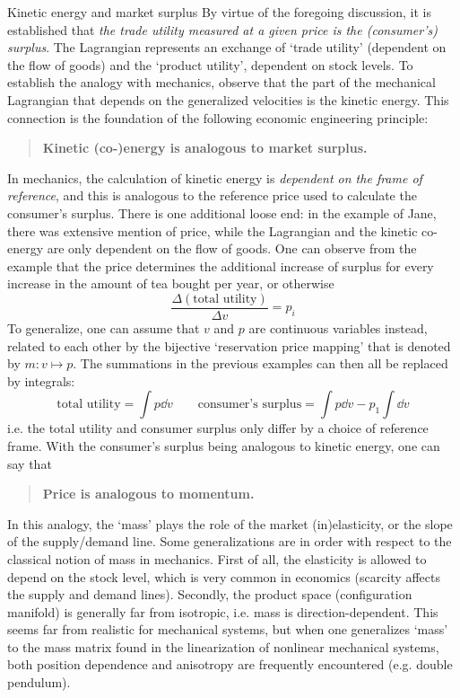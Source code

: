 \begin{econ}{Kinetic energy and market surplus}
   By virtue of the foregoing discussion, it is established that \emph{the trade utility measured at a given price is the (consumer's) surplus}. The Lagrangian represents an exchange of `trade utility' (dependent on the flow of goods) and the `product utility', dependent on stock levels. To establish the analogy with mechanics, observe that the part of the mechanical Lagrangian that depends on the generalized velocities is the kinetic energy. This connection is the foundation of the following economic engineering principle:
    \begin{quote}
        \textbf{Kinetic (co-)energy is analogous to market surplus.}
    \end{quote}
    In mechanics, the calculation of kinetic energy is \emph{dependent on the frame of reference}, and this is analogous to the reference price used to calculate the consumer's surplus. There is one additional loose end: in the example of Jane, there was extensive mention of price, while the Lagrangian and the kinetic co-energy are only dependent on the flow of goods. One can observe from the example that the price determines the additional increase of surplus for every increase in the amount of tea bought per year, or otherwise
    $$
        \frac{\Delta (\text{total utility})}{\Delta v} = p_i
    $$
    To generalize, one can assume that $v$ and $p$ are continuous variables instead, related to each other by the bijective `reservation price mapping' that is denoted by $m: v \mapsto p$. The summations in the previous examples can then all be replaced by integrals:
    $$ 
        \text{total utility} = \int p\dd{v} \qquad 
        \text{consumer's surplus} = \int p\dd{v} - p_1\int \dd{v}
    $$ 
    i.e. the total utility and consumer surplus only differ by a choice of reference frame. With the consumer's surplus being analogous to kinetic energy, one can say that
    \begin{quote}
        \textbf{Price is analogous to momentum.}
    \end{quote}
    In this analogy, the `mass' plays the role of the market (in)elasticity, or the slope of the supply/demand line. Some generalizations are in order with respect to the classical notion of mass in mechanics. First of all, the elasticity is allowed to depend on the stock level, which is very common in economics (scarcity affects the supply and demand lines). Secondly, the product space (configuration manifold) is generally far from isotropic, i.e. mass is direction-dependent. This seems far from realistic for mechanical systems, but when one generalizes `mass' to the mass matrix found in the linearization of nonlinear mechanical systems, both position dependence and anisotropy are frequently encountered (e.g. double pendulum).
\end{econ}

